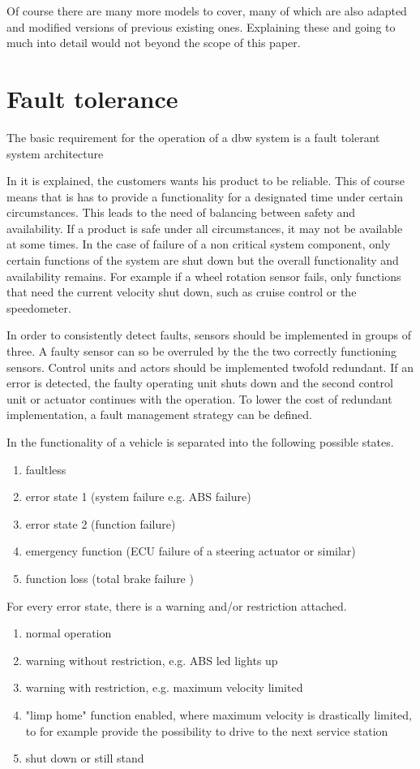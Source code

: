 \documentclass[conference]{IEEEtran}
\begin{document}
Of course there are many more models to cover, many of which are also adapted and modified versions of previous existing ones. Explaining these and going to much into detail would not beyond the scope of this paper.

\section{Fault tolerance}
The basic requirement for the operation of a dbw system is a fault tolerant system architecture %

In \cite{Lenkungshandbuch} it is explained, the customers wants his product to be reliable. This of course means that is has to provide a functionality for a designated time under certain circumstances. This leads to the need of balancing between safety and availability. If a product is safe under all circumstances, it may not be available at some times. In the case of failure of a non critical system component, only certain functions of the system are shut down but the overall functionality and availability remains. For example if a wheel rotation sensor fails, only functions that need the current velocity shut down, such as cruise control or the speedometer.

In order to consistently detect faults, sensors should be implemented in groups of three. A faulty sensor can so be overruled by the the two correctly functioning sensors. Control units and actors should be implemented twofold redundant. If an error is detected, the faulty operating unit shuts down and the second control unit or actuator continues with the operation. To lower the cost of redundant implementation, a fault management strategy can be defined. 

In \cite{Lenkungshandbuch} the functionality of a vehicle is separated into the following possible states. 
\begin{enumerate}
	\item faultless
	\item error state 1 (system failure e.g. ABS failure)
	\item error state 2 (function failure)
	\item emergency function (ECU failure of a steering actuator or similar)
	\item function loss (total brake failure	)
\end{enumerate}

For every error state, there is a warning and/or restriction attached. 
\begin{enumerate}
	\item normal operation
	\item warning without restriction, e.g. ABS led lights up
	\item warning with restriction, e.g. maximum velocity limited
	\item "limp home" function enabled, where maximum velocity is drastically limited, to for example provide the possibility to drive to the next service station
	\item shut down or still stand
\end{enumerate}
\end{document}
